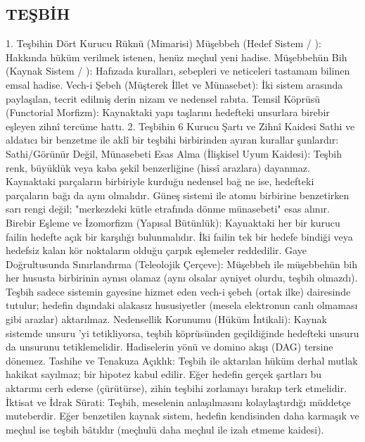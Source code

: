\documentclass[11pt,a4paper]{article}
\begin{document}
\subsection{TEŞBİH}




1. Teşbihin Dört Kurucu Rüknü (Mimarisi)
 Müşebbeh (Hedef Sistem / ): Hakkında hüküm verilmek istenen, henüz meçhul yeni hadise.
 Müşebbehün Bih (Kaynak Sistem / ): Hafızada kuralları, sebepleri ve neticeleri tastamam bilinen emsal hadise.
 Vech-i Şebeh (Müşterek İllet ve Münasebet): İki sistem arasında paylaşılan, tecrit edilmiş derin nizam ve nedensel rabıta.
 Temsil Köprüsü (Functorial Morfizm): Kaynaktaki yapı taşlarını hedefteki unsurlara birebir eşleyen zihnî tercüme hattı.
2. Teşbihin 6 Kurucu Şartı ve Zihnî Kaidesi
Sathi ve aldatıcı bir benzetme ile aklî bir teşbihi birbirinden ayıran kurallar şunlardır:
 Sathi/Görünür Değil, Münasebeti Esas Alma (İlişkisel Uyum Kaidesi):
Teşbih renk, büyüklük veya kaba şekil benzerliğine (hissî arazlara) dayanmaz. Kaynaktaki parçaların birbiriyle kurduğu nedensel bağ ne ise, hedefteki parçaların bağı da aynı olmalıdır. Güneş sistemi ile atomu birbirine benzetirken sarı rengi değil; "merkezdeki kütle etrafında dönme münasebeti" esas alınır.
 Birebir Eşleme ve İzomorfizm (Yapısal Bütünlük):
Kaynaktaki her bir kurucu failin hedefte açık bir karşılığı bulunmalıdır. İki failin tek bir hedefe bindiği veya hedefsiz kalan kör noktaların olduğu çarpık eşlemeler reddedilir.
 Gaye Doğrultusunda Sınırlandırma (Teleolojik Çerçeve):
Müşebbeh ile müşebbehün bih her hususta birbirinin aynısı olamaz (aynı olsalar ayniyet olurdu, teşbih olmazdı). Teşbih sadece sistemin gayesine hizmet eden vech-i şebeh (ortak ilke) dairesinde tutulur; hedefin dışındaki alakasız hususiyetler (mesela elektronun canlı olmaması gibi arazlar) aktarılmaz.
 Nedensellik Korunumu (Hüküm İntikali):
Kaynak sistemde  unsuru 'yi tetikliyorsa, teşbih köprüsünden geçildiğinde hedefteki  unsuru da  unsurunu tetiklemelidir. Hadiselerin yönü ve domino akışı (DAG) tersine dönemez.
 Tashihe ve Tenakuza Açıklık:
Teşbih ile aktarılan hüküm derhal mutlak hakikat sayılmaz; bir hipotez kabul edilir. Eğer hedefin gerçek şartları bu aktarımı cerh ederse (çürütürse), zihin teşbihi zorlamayı bırakıp terk etmelidir.
 İktisat ve İdrak Sürati:
Teşbih, meselenin anlaşılmasını kolaylaştırdığı müddetçe muteberdir. Eğer benzetilen kaynak sistem, hedefin kendisinden daha karmaşık ve meçhul ise teşbih bâtıldır (meçhulü daha meçhul ile izah etmeme kaidesi).
\end{document}

